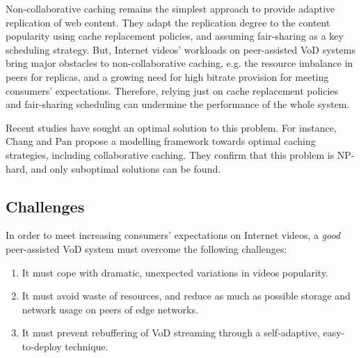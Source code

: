 Non-collaborative caching remains the simplest approach to provide adaptive replication of web content\cite{popularity_awaregreedydual_size_icdcs99}. They adapt the replication degree to the content popularity using cache replacement policies, and assuming fair-sharing as a key scheduling strategy. But, Internet videos' workloads on peer-assisted VoD systems bring major obstacles to non-collaborative caching, e.g. the resource imbalance in peers for replicas, and a growing need for high bitrate provision for meeting consumers' expectations. Therefore, relying just on cache replacement policies and fair-sharing scheduling can undermine the performance of the whole system.

Recent studies have sought an optimal solution to this problem. For instance, Chang and Pan
\cite{pavod_icnp12} propose a modelling framework towards optimal caching strategies, including collaborative caching. They confirm that this problem is NP-hard, and only suboptimal solutions can be found.



\subsection{Challenges}

In order to meet increasing consumers' expectations on Internet videos, a \emph{good} peer-assisted VoD system must overcome the following challenges:
\begin{enumerate}
		\item  It must cope with dramatic, unexpected variations in videos popularity.
		\item  It must avoid waste of resources, and reduce as much as possible storage and network usage on peers of edge networks.
		\item  It must prevent rebuffering of VoD streaming through a self-adaptive, easy-to-deploy technique.
\end{enumerate}

